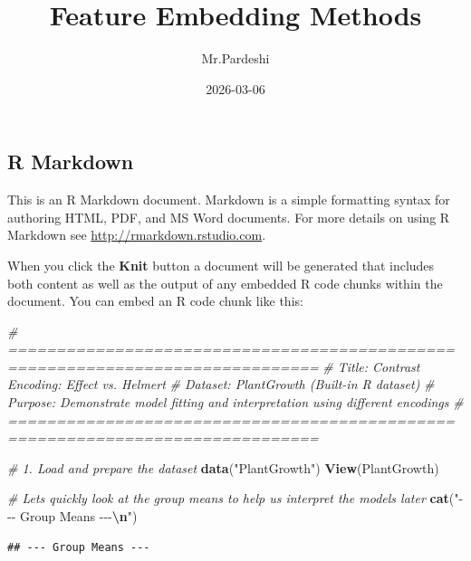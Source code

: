 \documentclass[
]{article}
\title{Feature Embedding Methods}
\author{Mr.Pardeshi}
\date{2026-03-06}
\newenvironment{Shaded}{\begin{snugshade}}{\end{snugshade}}
\newcommand{\CommentTok}[1]{\textcolor[rgb]{0.56,0.35,0.01}{\textit{#1}}}
\newcommand{\FunctionTok}[1]{\textcolor[rgb]{0.13,0.29,0.53}{\textbf{#1}}}
\newcommand{\NormalTok}[1]{#1}
\newcommand{\OtherTok}[1]{\textcolor[rgb]{0.56,0.35,0.01}{#1}}
\newcommand{\SpecialCharTok}[1]{\textcolor[rgb]{0.81,0.36,0.00}{\textbf{#1}}}
\newcommand{\StringTok}[1]{\textcolor[rgb]{0.31,0.60,0.02}{#1}}
\begin{document}
\maketitle

\subsection{R Markdown}\label{r-markdown}

This is an R Markdown document. Markdown is a simple formatting syntax
for authoring HTML, PDF, and MS Word documents. For more details on
using R Markdown see \url{http://rmarkdown.rstudio.com}.

When you click the \textbf{Knit} button a document will be generated
that includes both content as well as the output of any embedded R code
chunks within the document. You can embed an R code chunk like this:

\begin{Shaded}
\begin{Highlighting}[]
\CommentTok{\# ==============================================================================}
\CommentTok{\# Title: Contrast Encoding: Effect vs. Helmert}
\CommentTok{\# Dataset: PlantGrowth (Built{-}in R dataset)}
\CommentTok{\# Purpose: Demonstrate model fitting and interpretation using different encodings}
\CommentTok{\# ==============================================================================}

\CommentTok{\# 1. Load and prepare the dataset}
\FunctionTok{data}\NormalTok{(}\StringTok{"PlantGrowth"}\NormalTok{)}
\FunctionTok{View}\NormalTok{(PlantGrowth)}

\CommentTok{\# Let\textquotesingle{}s quickly look at the group means to help us interpret the models later}
\FunctionTok{cat}\NormalTok{(}\StringTok{"{-}{-}{-} Group Means {-}{-}{-}}\SpecialCharTok{\textbackslash{}n}\StringTok{"}\NormalTok{)}
\end{Highlighting}
\end{Shaded}

\begin{verbatim}
## --- Group Means ---
\end{verbatim}

\begin{Shaded}
\end{Shaded}
\end{document}

